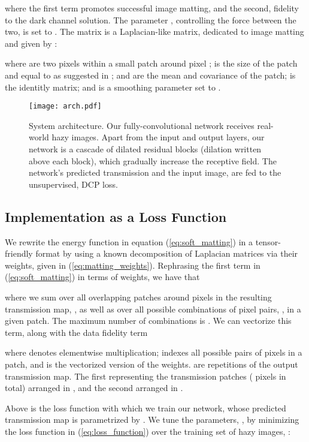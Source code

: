 \documentclass[10pt,twocolumn,twoside]{IEEEtran}
\begin{document}
where the first term promotes successful image matting, and the second, fidelity to the dark channel solution. The parameter , controlling the force between the two, is set to  \cite{DCP}. The matrix  is a Laplacian-like matrix, dedicated to image matting and given by \cite{soft_matting}:

where  are two pixels within a small patch  around pixel ;  is the size of the patch and equal to  as suggested in \cite{soft_matting};  and  are the mean and covariance of the patch;  is the identitly matrix; and  is a smoothing parameter set to  \cite{soft_matting}.

\begin{figure*}[t!]
\centering
\texttt{[image: arch.pdf]}
\caption{System architecture. Our fully-convolutional network receives real-world hazy images. Apart from the input and output layers, our network is a cascade of dilated residual blocks (dilation written above each block), which gradually increase the receptive field. The network's predicted transmission and the input image, are fed to the unsupervised, DCP loss.}
\label{fig:architecture}
\end{figure*}
\vspace{-1mm}

\subsection{Implementation as a Loss Function}

We rewrite the energy function in equation (\ref{eq:soft_matting}) in a tensor-friendly format by using a known decomposition of Laplacian matrices via their weights, given in (\ref{eq:matting_weights}). Rephrasing the first term in (\ref{eq:soft_matting}) in terms of weights, we have that

where we sum over all overlapping patches around  pixels in the resulting transmission map, , as well as over all possible combinations of pixel pairs, , in a given  patch. The maximum number of combinations is . We can vectorize this term, along with the data fidelity term

where  denotes elementwise multiplication;  indexes all possible pairs of pixels in a  patch, and  is the vectorized version of the weights.  are repetitions of the output transmission map. The first representing the transmission patches ( pixels in total) arranged in , and the second arranged in . 

Above is the loss function with which we train our network, whose predicted transmission map is parametrized by . We tune the parameters, , by minimizing the loss function in (\ref{eq:loss_function}) over the training set of hazy images, :
\end{document}
